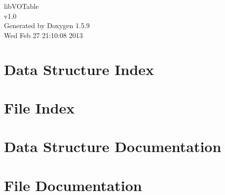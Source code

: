 \documentclass[letterpaper]{book}
\begin{document}
\hypersetup{pageanchor=false}
\begin{titlepage}
\vspace*{7cm}
\begin{center}
{\Large libVOTable \\[1ex]\large v1.0 }\\
\vspace*{1cm}
{\large Generated by Doxygen 1.5.9}\\
\vspace*{0.5cm}
{\small Wed Feb 27 21:10:08 2013}\\
\end{center}
\end{titlepage}
\clearemptydoublepage
{}
\tableofcontents
\clearemptydoublepage
{}
\hypersetup{pageanchor=true}
\chapter{Data Structure Index}

\chapter{File Index}

\chapter{Data Structure Documentation}





\chapter{File Documentation}










\printindex
\end{document}
